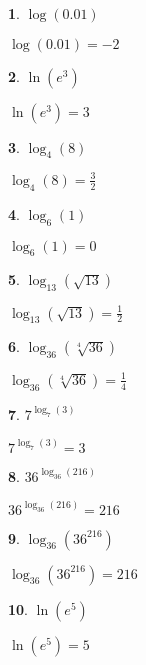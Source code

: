 \documentclass{amsbook}
\newtheorem{exc}{}
\newenvironment{ex}{\begin{exc}\normalfont}{\end{exc}}
\numberwithin{section}{chapter}
\numberwithin{equation}{chapter}
\begin{document}
\begin{multicols}{3}
\begin{ex}
	$\log(0.01)$
	\begin{sol}
		$\log(0.01) = -2$
	\end{sol}
\end{ex}
\begin{ex}
	$\ln\left(e^3\right)$
	\begin{sol}
	$\ln\left(e^3\right) = 3$	
	\end{sol}
\end{ex}
\begin{ex}
	$\log_{4} (8)$
	\begin{sol}
		$\log_{4} (8) = \frac{3}{2}$
	\end{sol}
\end{ex}
\begin{ex}
	$\log_{6} (1)$
	\begin{sol}
		$\log_{6} (1) = 0$
	\end{sol}
\end{ex}
\begin{ex}
	$\log_{13} \left(\sqrt{13}\right)$
	\begin{sol}
		$\log_{13} \left(\sqrt{13}\right) = \frac{1}{2}$
	\end{sol}
\end{ex}
\begin{ex}
	$\log_{36} \left(\sqrt[4]{36}\right)$
	\begin{sol}
		$\log_{36} \left(\sqrt[4]{36}\right) = \frac{1}{4}$
	\end{sol}
\end{ex}
\begin{ex}
	$7^{\log_{7} (3)}$
	\begin{sol}
	$7^{\log_{7} (3)} = 3$	
	\end{sol}
\end{ex}
\begin{ex}
	 $36^{\log_{36}(216)}$
	\begin{sol}
		$36^{\log_{36}(216)} = 216$
	\end{sol}
\end{ex}
\begin{ex}
	$\log_{36} \left(36^{216}\right)$
	\begin{sol}
		$\log_{36} \left(36^{216}\right) = 216$
	\end{sol}
\end{ex}
\begin{ex}
	$\ln \left(e^{5} \right)$
	\begin{sol}
		$\ln(e^{5}) = 5$
	\end{sol}
\end{ex}

\end{multicols}
\end{document}
